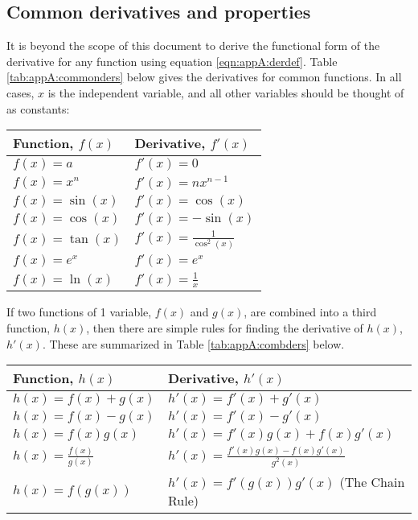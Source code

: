 

\subsection{Common derivatives and properties}
It is beyond the scope of this document to derive the functional form of the derivative for any function using equation \ref{eqn:appA:derdef}. Table \ref{tab:appA:commonders} below gives the derivatives for common functions. In all cases, $x$ is the independent variable, and all other variables should be thought of as constants:

\begin{center}
\begin{tabular}{l l}
\textbf{Function, $f(x)$} & \textbf{Derivative, $f'(x)$}\\
\hline\hline
$f(x)=a$ & $f'(x)=0$ \\
$f(x)=x^n$ & $f'(x)=nx^{n-1}$ \\
$f(x)=\sin(x)$ & $f'(x)=\cos(x)$ \\
$f(x)=\cos(x)$ & $f'(x)=-\sin(x)$ \\
$f(x)=\tan(x)$ & $f'(x)=\frac{1}{\cos^2(x)}$ \\
$f(x)=e^x$ & $f'(x)=e^x$ \\
$f(x)=\ln(x)$ & $f'(x)=\frac{1}{x}$ \\
\hline
\end{tabular}
\end{center}
If two functions of 1 variable, $f(x)$ and $g(x)$, are combined into a third function, $h(x)$, then there are simple rules for finding the derivative of $h(x)$, $h'(x)$. These are summarized in Table \ref{tab:appA:combders} below.
\begin{center}
\begin{tabular}{l l}
\textbf{Function, $h(x)$} & \textbf{Derivative, $h'(x)$}\\
\hline\hline
$h(x)=f(x)+g(x)$ & $h'(x)=f'(x)+g'(x)$ \\
$h(x)=f(x)-g(x)$ & $h'(x)=f'(x)-g'(x)$ \\
$h(x)=f(x)g(x)$ & $h'(x)=f'(x)g(x)+f(x)g'(x)$ \\
$h(x)=\frac{f(x)}{g(x)}$ & $h'(x)=\frac{f'(x)g(x)-f(x)g'(x)}{g^2(x)}$ \\
$h(x)=f(g(x))$ & $h'(x)=f'(g(x))g'(x)$ (The Chain Rule) \\
\hline
\end{tabular}
\end{center}
